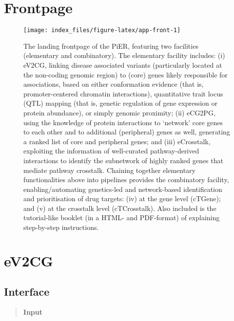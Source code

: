 \documentclass[
  oneside]{book}
\begin{document}
\hypertarget{frontpage}{%
\chapter{Frontpage}\label{frontpage}}

\begin{figure}

{\centering \texttt{[image: index\_files/figure-latex/app-front-1]} 

}

\caption{The landing frontpage of the PiER, featuring two facilities (elementary and combinatory). The elementary facility includes: (i) eV2CG, linking disease associated variants (particularly located at the non-coding genomic region) to (core) genes likely responsible for associations, based on either conformation evidence (that is, promoter-centered chromatin interactions), quantitative trait locus (QTL) mapping (that is, genetic regulation of gene expression or protein abundance), or simply genomic proximity; (ii) eCG2PG, using the knowledge of protein interactions to ‘network’ core genes to each other and to additional (peripheral) genes as well, generating a ranked list of core and peripheral genes; and (iii) eCrosstalk, exploiting the information of well-curated pathway-derived interactions to identify the subnetwork of highly ranked genes that mediate pathway crosstalk. Chaining together elementary functionalities above into pipelines provides the combinatory facility, enabling/automating genetics-led and network-based identification and prioritisation of drug targets: (iv) at the gene level (cTGene); and (v) at the crosstalk level (cTCrosstalk). Also included is the tutorial-like booklet (in a HTML- and PDF-format) of explaining step-by-step instructions.}\label{fig:app-front}
\end{figure}

\hypertarget{ev2cg}{%
\chapter{eV2CG}\label{ev2cg}}

\hypertarget{interface}{%
\section{Interface}\label{interface}}

\begin{quote}
\textbf{Input}
\end{quote}
\end{document}
